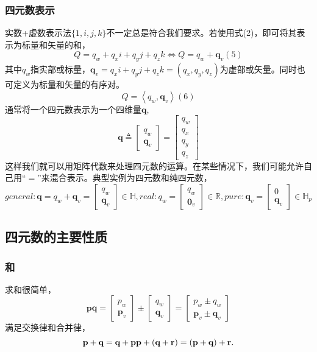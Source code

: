 \documentclass{article}
\begin{document}
   \subsubsection{四元数表示}
实数+虚数表示法$\{1,i,j,k\}$不一定总是符合我们要求。若使用式(2)，即可将其表示为标量和矢量的和，
$$
    Q=q_w+q_xi+q_yj+q_zk \Leftrightarrow  Q=q_w+\textbf{q}_v  (5)
$$其中$q_w$指实部或标量，$\textbf{q}_v = q_xi+q_yj+q_zk=(q_x,q_y,q_z)$为虚部或矢量。同时也可定义为标量和矢量的有序对。
$$
    Q=\left \langle q_w,\textbf{q}_v \right \rangle (6)
$$
通常将一个四元数表示为一个四维量$\textbf{q}$,
$$
\textbf{q} \triangleq \begin{bmatrix}q_w\\\textbf{q}_v 
\end{bmatrix} = 
\begin{bmatrix}q_w \\ q_x \\ q_y\\ q_z
\end{bmatrix} 
$$这样我们就可以用矩阵代数来处理四元数的运算。在某些情况下，我们可能允许自己用“$=$”来混合表示。典型实例为四元数和纯四元数，
$$
general: \textbf{q} = q_w+\textbf{q}_v = \begin{bmatrix}q_w\\\textbf{q}_v 
\end{bmatrix} \in \mathbb{H},
real: q_w = \begin{bmatrix}q_w\\\textbf{0}_v 
\end{bmatrix} \in \mathbb{R},
pure: \textbf{q}_v = \begin{bmatrix}0\\\textbf{q}_v 
\end{bmatrix} \in \mathbb{H}_p$$
\subsection{四元数的主要性质}
\subsubsection{和}
求和很简单，
$$
\textbf{p} \textbf{q} = \begin{bmatrix}p_w\\\textbf{p}_v 
\end{bmatrix} \pm \begin{bmatrix}q_w\\\textbf{q}_v 
\end{bmatrix} = \begin{bmatrix}p_w \pm q_w\\\textbf{p}_v \pm \textbf{q}_v 
\end{bmatrix}
$$满足交换律和合并律，
$$
\textbf{p}+\textbf{q} = \textbf{q} + \textbf{p}
\\
\textbf{p} + (\textbf{q}+\textbf{r}) = (\textbf{p}+\textbf{q})+ \textbf{r}.
$$
\end{document}
